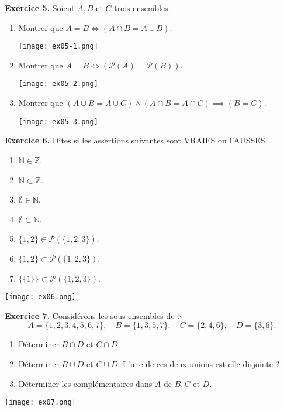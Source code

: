 \documentclass[a4paper, 10pt]{report}
\begin{document}
	\fancyhf{}
	\renewcommand{\headrule}
	{\rule{\textwidth}{0pt}}
	
	\noindent
	\textbf{Exercice 5.} Soient $A, B$ et $C$ trois ensembles.
	\begin{enumerate}[label=(\roman*)]
		\item Montrer que $A = B \iff (A \cap B = A \cup B)$.
		
		\texttt{[image: ex05-1.png]}
		
		\newpage
		\item Montrer que $A = B \iff
			(\mathcal{P}(A) = \mathcal{P}(B))$.
		
		\texttt{[image: ex05-2.png]}
		
		\item Montrer que $(A \cup B = A \cup C) \land
			(A \cap B = A \cap C) \implies (B = C)$.
		
		\texttt{[image: ex05-3.png]}
		
	\end{enumerate}
	
	\newpage
	
	\noindent
	\textbf{Exercice 6.} Dites si les assertions suivantes sont
	VRAIES ou FAUSSES.
	\begin{enumerate}[label=(\roman*)]
		\item $\mathbb{N} \in \mathbb{Z}$.
		\item $\mathbb{N} \subset \mathbb{Z}$.
		\item $\emptyset \in \mathbb{N}$.
		\item $\emptyset \subset \mathbb{N}$.
		\item $\{1,2\} \in \mathcal{P}(\{1,2,3\})$.
		\item $\{1,2\} \subset \mathcal{P}(\{1,2,3\})$.
		\item $\{\{1\}\} \subset \mathcal{P}(\{1,2,3\})$.
	\end{enumerate}
	
	\texttt{[image: ex06.png]}
	
	\vspace{5mm}
	\noindent
	\textbf{Exercice 7.} Considérons les sous-ensembles de $\mathbb{N}$
	\[
		A = \{1,2,3,4,5,6,7\}, \quad B = \{1,3,5,7\}, \quad
			C = \{2,4,6\}, \quad D = \{3,6\}.
	\]
	\begin{enumerate}[label=(\roman*)]
		\item Déterminer $B \cap D$ et $C \cap D$.
		\item Déterminer $B \cup D$ et $C \cup D$. L'une de
		ces deux unions est-elle disjointe ?
		\item Déterminer les complémentaires dans $A$ de $B, C$ et $D$.
	\end{enumerate}
	
	\texttt{[image: ex07.png]}
	
\end{document}
